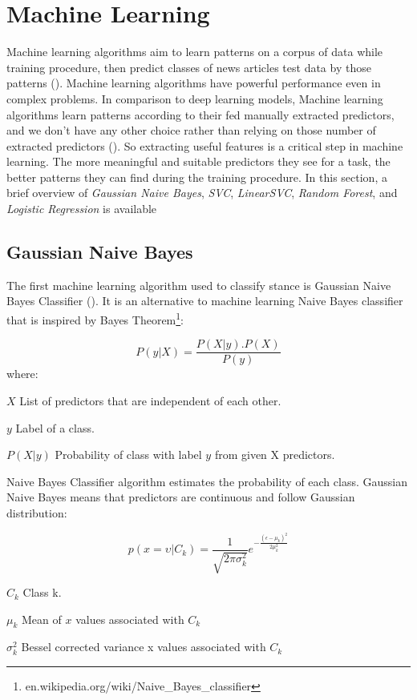 \section{Machine Learning}
\label{lr:ml}
Machine learning algorithms aim to learn patterns on a corpus of data while training procedure, then predict classes of news articles test data by those patterns (\cite{book_fake}). Machine learning algorithms have powerful performance even in complex problems. In comparison to deep learning models, Machine learning algorithms learn patterns according to their fed manually extracted predictors, and we don't have any other choice rather than relying on those number of extracted predictors (\cite{book_fake}). So extracting useful features  is a critical step in machine learning. The more meaningful and suitable predictors they see for a task, the better patterns they can find during the training procedure. In this section, a brief overview of \textit{Gaussian Naive Bayes}, \textit{SVC}, \textit{LinearSVC}, \textit{Random Forest}, and \textit{Logistic Regression} is available
\subsection{Gaussian Naive Bayes}
The first machine learning algorithm used to classify stance is Gaussian Naive Bayes Classifier (\cite{GNbayes}). It is an alternative to machine learning Naive Bayes classifier that is inspired by Bayes Theorem\footnote{en.wikipedia.org/wiki/Naive\_Bayes\_classifier}:

\[ P\left(y | X\right) =   \frac{P(X|y).P(X)}{P(y)} \]
where:
\begin{eqexpl}[25mm]
	\item{$X$} List of predictors that are independent of each other.
	\item{$y$} Label of a class.
	\item{$P\left(X|y\right)$} Probability of class with label $y$ from given X predictors.
\end{eqexpl}
Naive Bayes Classifier algorithm estimates the probability of each class. Gaussian Naive Bayes means that predictors are continuous and follow Gaussian distribution:

\[p\left(x=\upsilon | C_{k}\right) = \frac{1}{\sqrt{2\pi\sigma_{k}^{2}}}e^{-\frac{\left(\epsilon-\mu_{k}\right)^{2}}{2\mu^{2}_{k}}}\]
\begin{eqexpl}[25mm]
	\item{$C_{k}$} Class k.
	\item{$\mu_{k}$} Mean of $x$ values associated with $C_{k}$
	\item{$\sigma^{2}_{k}$} Bessel corrected variance x values associated with $C_{k}$
\end{eqexpl}

